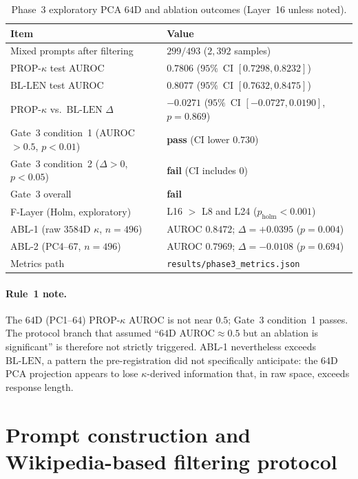 \documentclass{article}
\newcommand{\propk}{\mathrm{PROP}\text{-}\kappa}
\newcommand{\bllen}{\mathrm{BL\text{-}LEN}}
\begin{document}
\begin{table}[t]
\centering
\caption{Phase~3 exploratory {PCA} $64${D} and ablation outcomes (Layer~16 unless noted).}
\label{tab:phase3}
\small
\begin{tabular}{@{}ll@{}}
\toprule
Item & Value \\
\midrule
Mixed prompts after filtering & $299/493$ ($2{,}392$ samples) \\
$\propk$ test {AUROC} & $0.7806$ ($95\%$~{CI} $[0.7298, 0.8232]$) \\
$\bllen$ test {AUROC} & $0.8077$ ($95\%$~{CI} $[0.7632, 0.8475]$) \\
$\propk$ vs.\ $\bllen$ $\Delta$ & $-0.0271$ ($95\%$~{CI} $[-0.0727, 0.0190]$, $p=0.869$) \\
Gate~3 condition~1 ({AUROC}$>0.5$, $p<0.01$) & \textbf{pass} ({CI} lower $0.730$) \\
Gate~3 condition~2 ($\Delta>0$, $p<0.05$) & \textbf{fail} ({CI} includes $0$) \\
Gate~3 overall & \textbf{fail} \\
{F-Layer} (Holm, exploratory) & L16 $>$ L8 and L24 ($p_{\mathrm{holm}}<0.001$) \\
{ABL-1} (raw $3584${D} $\kappa$, $n=496$) & {AUROC} $0.8472$; $\Delta=+0.0395$ ($p=0.004$) \\
{ABL-2} ({PC4}--{67}, $n=496$) & {AUROC} $0.7969$; $\Delta=-0.0108$ ($p=0.694$) \\
Metrics path & \texttt{results/phase3\_metrics.json} \\
\bottomrule
\end{tabular}
\end{table}

\paragraph{Rule~1 note.}
The $64${D} ({PC1}--{64}) $\propk$ {AUROC} is not near $0.5$; Gate~3 condition~1 passes. The protocol branch that assumed ``$64${D} {AUROC}$\approx 0.5$ but an ablation is significant'' is therefore not strictly triggered. {ABL-1} nevertheless exceeds $\bllen$, a pattern the pre-registration did not specifically anticipate: the $64${D} {PCA} projection appears to lose $\kappa$-derived information that, in raw space, exceeds response length.

\section{Prompt construction and {Wikipedia}-based filtering protocol}
\label{app:filtering}
\end{document}
